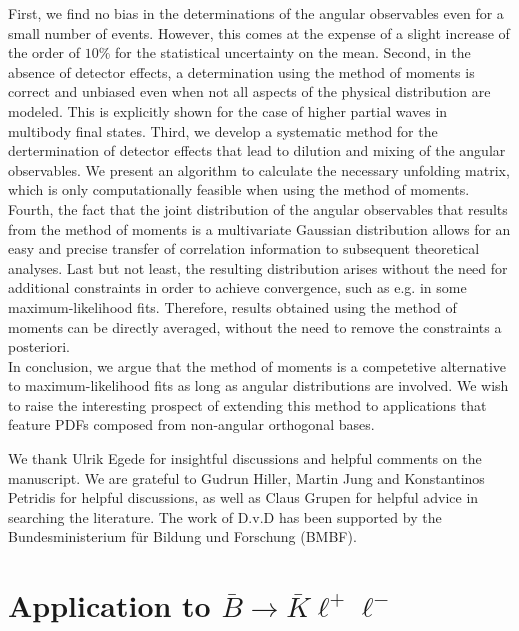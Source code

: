 \documentclass[aps,prd,reprint,nofootinbib,preprintnumbers]{revtex4}
\begin{document}
First, we find no bias in the determinations of the angular observables even for a small number of events.
However, this comes at the expense of a slight increase of the order of $10\%$ for the statistical uncertainty
on the mean.
Second, in the absence of detector effects, a determination using the method of moments is correct and unbiased
even when not all aspects of the physical distribution are modeled. This is explicitly shown for the case of
higher partial waves in multibody final states.
Third, we develop a systematic method for the dertermination of detector effects that lead to
dilution and mixing of the angular observables. We present an algorithm to calculate the necessary
unfolding matrix, which is only computationally feasible when using the method of moments.
Fourth, the fact that the joint distribution of the angular observables that results from the method of moments
is a multivariate Gaussian distribution allows for an easy and precise transfer of correlation
information to subsequent theoretical analyses.
Last but not least, the resulting distribution arises without the need for additional constraints
in order to achieve convergence, such as e.g. in some maximum-likelihood fits. Therefore, results obtained
using the method of moments can be directly averaged, without the need to remove
the constraints a posteriori.\\

In conclusion, we argue that the method of moments is a competetive alternative to
maximum-likelihood fits as long as angular distributions are involved. We wish to raise
the interesting prospect of extending this method to applications that feature
PDFs composed from non-angular orthogonal bases.


\acknowledgments

We thank Ulrik Egede for insightful discussions and helpful comments on the
manuscript. We are grateful to Gudrun Hiller, Martin Jung and Konstantinos Petridis for helpful discussions,
as well as Claus Grupen for helpful advice in searching the literature.
The work of D.v.D has been supported by the Bundesministerium f\"ur Bildung und Forschung (BMBF).

\appendix

\section{Application to $\bar{B}\to\bar{K}\ell^+\ell^-$}
\label{app:btokll}
\end{document}
